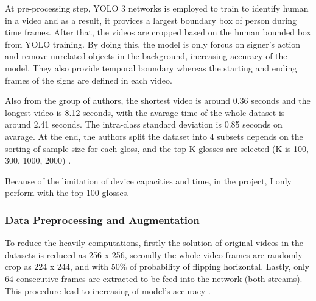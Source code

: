 \documentclass[a4paper, 12pt]{article}
\begin{document}
At pre-processing step, YOLO 3 networks is employed to train to identify human in a video and as a result, it provices a largest boundary box of person during time frames. After that, the videos are cropped based on the human bounded box from YOLO training. By doing this, the model is only forcus on signer's action and remove unrelated objects in the background, increasing accuracy of the model. They also provide temporal boundary whereas the starting and ending frames of the signs are defined in each video.

Also from the group of authors, the shortest video is around 0.36 seconds and the longest video is 8.12 seconds, with the avarage time of the whole dataset is around 2.41 seconds. The intra-class standard deviation is 0.85 seconds on avarage. At the end, the authors split the dataset into 4 subsets depends on the sorting of sample size for each gloss, and the top K glosses are selected (K is 100, 300, 1000, 2000) \citep{li2020word}.

Because of the limitation of device capacities and time, in the project, I only perform with the top 100 glosses.

\begin{table}[H]
    \centering
    \caption{Statistic with WLASL dataset}
    \label{tab:WLASL statistic}
    \end{table}

\subsubsection{Data Preprocessing and Augmentation}
To reduce the heavily computations, firstly the solution of original videos in the datasets is reduced as 256 x 256, secondly the whole video frames are randomly crop as 224 x 244, and with 50\% of probability of flipping horizontal. Lastly, only 64 consecutive frames are extracted to be feed into the network (both streams). This procedure lead to increasing of model's accuracy \citep{karpathy2014large}.
\end{document}
